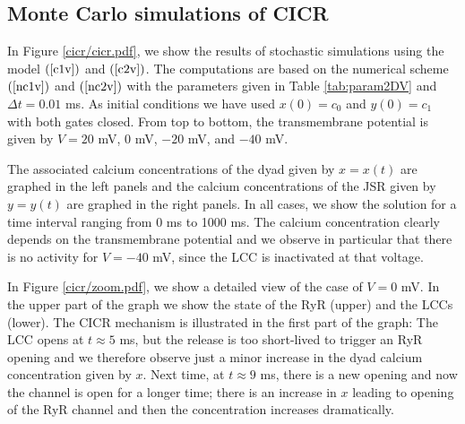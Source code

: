 \subsection{Monte Carlo simulations of CICR}

In Figure \ref{cicr/cicr.pdf}, we show the results of stochastic simulations 
using the model $(\ref{c1v})$ and $(\ref{c2v}) $. 
The computations are based on the numerical scheme 
$(\ref{nc1v})$  and $(\ref{nc2v}) $ with the parameters given in Table \ref{tab:param2DV} and $\Delta t=0.01$ ms. As initial conditions we have used $x(0) = c_0$ and $y(0) = c_1$ with both gates closed.
From top to bottom, the transmembrane potential is given by $V=20$ mV, $0$ mV, $-20$ mV, and $-40$ mV. 

The associated calcium concentrations of the dyad given by $x=x(t)$ are graphed in the left panels and the 
calcium concentrations of the JSR given by $y=y(t)$ are graphed in the right panels. 
In all cases, we show the solution for a time interval ranging from 0 ms to 1000 ms. 
The calcium concentration clearly depends on the transmembrane potential and we observe in particular that there
is no activity for $V=-40$ mV, since the LCC is inactivated at that voltage. 

In Figure \ref{cicr/zoom.pdf}, we show a detailed view of the case of $V=0$ mV. 
In the upper part of the graph we show the state
of the RyR (upper) and the LCCs (lower). The CICR mechanism is illustrated in the first part of the graph: The LCC opens at $t \approx 5$ ms, but the release is too short-lived to trigger an RyR opening and we therefore observe just a minor increase in the dyad calcium concentration given by  $x$. Next time, at 
$t \approx 9$ ms, there is a new opening and now the channel is open for a longer time;
there is an increase in $x$ leading to opening of the RyR channel and then the concentration increases dramatically.




